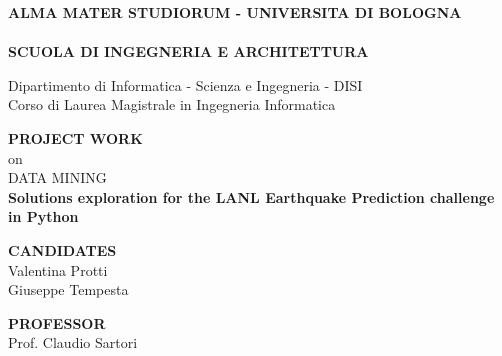 \thispagestyle{empty}
\begin{titlepage}

\vspace*{-1.5cm}
\begin{center}
  \large
  \textbf{ALMA MATER STUDIORUM - UNIVERSITA DI BOLOGNA}\\
  
  \hrulefill\\
  
  \textbf{SCUOLA DI INGEGNERIA  E ARCHITETTURA}\\
  \vspace*{.75cm}
  
  
  Dipartimento di Informatica - Scienza e Ingegneria - DISI\\
  Corso di Laurea Magistrale in Ingegneria Informatica\\
  
  \vspace*{1.2cm}
  
  
  \textbf{PROJECT WORK}\\
  \vspace*{.4cm}
  on\\
  \vspace*{.4cm}
  DATA MINING\\

  \vspace*{2cm} \LARGE
  \textbf{Solutions exploration for the LANL Earthquake Prediction challenge in Python}\\
 \end{center}
 
 \vspace*{3cm}
 
 \begin{flushleft}
  \textbf{CANDIDATES}\\ Valentina Protti \\ Giuseppe Tempesta \\
\end{flushleft}

\vspace*{-2cm}

 \begin{flushright}
  \textbf{PROFESSOR}\\ Prof. Claudio Sartori \\
 \end{flushright}


\vspace*{2cm}

\clearpage
\end{titlepage}